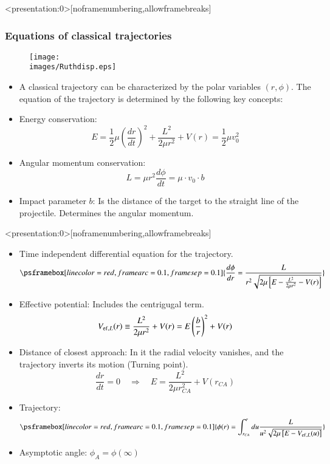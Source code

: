 \documentclass[english,10pt]{beamer}
\newcommand{\gitem}[1]{\item {\textcolor{deepcarmine}{  #1}}}
\newcommand{\images}{images}
\begin{document}
\begin{frame}<presentation:0>[noframenumbering,allowframebreaks]
\frametitle{Equations of  classical trajectories}
\begin{figure}{\par \resizebox*{0.3\textwidth}{!}
{\texttt{[image: \\images/Ruthdisp.eps]}} \par}
\end{figure}
\begin{itemize}

\gitem{A classical trajectory} can be characterized by the polar variables $(r,\phi)$. The equation of the trajectory is determined by the following key concepts:

\gitem{Energy conservation:}
\begin{displaymath}
E=\frac{1}{2} \mu \left(\frac {dr}{dt}\right)^2 + \frac{L^2}{2\mu r^2}+V(r) = \frac{1}{2} \mu v_0^2
\end{displaymath}

\gitem{Angular momentum conservation:}
$$
L=\mu r^2\frac{d\phi}{dt} = \mu \cdot v_0 \cdot b 
$$
\gitem{Impact parameter $b$:} Is the distance of the target to the straight line of the projectile. Determines the angular momentum.
\end{itemize}
\end{frame}



\begin{frame}<presentation:0>[noframenumbering,allowframebreaks]
\begin{itemize}

\gitem{Time independent differential equation} for the trajectory.
$$
\psframebox[linecolor=red,framearc=0.1,framesep=0.1]{
\frac{d\phi}{dr}=
\frac{L}{r^2\sqrt{2\mu\left[E-\frac{L^2}{2\mu r^2}-V(r)\right]}}
}%
$$


\gitem{Effective potential:} Includes the centrigugal term.
\begin{displaymath}
 V_{{\rm ef},L}(r) \equiv \frac{L^2}{2\mu r^2}+V(r) = E \left(\frac{b}{r}\right)^2 + V(r)
\end{displaymath}


\gitem{Distance of closest approach:}  In it the radial velocity vanishes, and the trajectory inverts its motion (Turning point). 
$$
\frac{dr}{dt}=0 \quad  \Rightarrow \quad E=  \frac{L^2}{2\mu r_{CA}^2}+V(r_{CA})
$$

\gitem{Trajectory:}
\begin{displaymath}
\psframebox[linecolor=red,framearc=0.1,framesep=0.1]{
\phi(r)=
\int_{r_{CA}}^r  du
\frac{L}{u^2\sqrt{2\mu\left[E- V_{{\rm ef},L}(u)\right]}}  
}%
\end{displaymath}
\gitem{Asymptotic angle:} $\phi_A = \phi(\infty)$ 


\end{itemize}
\end{frame}
\end{document}
